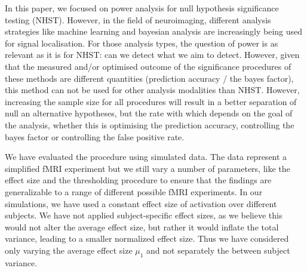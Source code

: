 {\color{Cyan}In this paper, we focused on power analysis for null hypothesis significance testing (NHST).  However, in the field of neuroimaging, different analysis strategies like machine learning and bayesian analysis are increasingly being used for signal localisation.  For those analysis types, the question of power is as relevant as it is for NHST: can we detect what we aim to detect.  However, given that the measured and/or optimised outcome of the significance procedures of these methods are different quantities (prediction accuracy / the bayes factor), this method can not be used for other analysis modalities than NHST.  However, increasing the sample size for all procedures will result in a better separation of null an alternative hypotheses, but the rate with which depends on the goal of the analysis, whether this is optimising the prediction accuracy, controlling the bayes factor or controlling the false positive rate.  }

We have evaluated the procedure using simulated data.  The data represent a simplified fMRI experiment but we still vary a number of parameters, like the effect size and the thresholding procedure to ensure that the findings are generalizable to a range of different possible fMRI experiments.  In our simulations, we have used a constant effect size of activation over different subjects.  We have not applied subject-specific effect sizes, as we believe this would not alter the average effect size, but rather it would inflate the total variance, leading to a smaller normalized effect size.
Thus we have considered only varying the average effect size $\mu_1$ and not separately the between subject variance.

